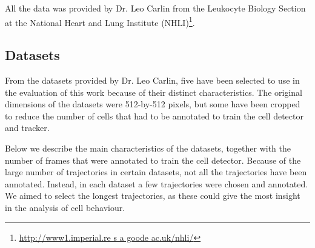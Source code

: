     
    
    All the data was provided by Dr. Leo Carlin from the Leukocyte Biology Section at the National Heart and Lung Institute (NHLI)\footnote{\url{http://www1.imperial.re  s a goode ac.uk/nhli/}}.
    
    \subsection{Datasets \statusfirstdraft}
       
	From the datasets provided by Dr. Leo Carlin, five have been selected to use in the evaluation of this work because of their distinct characteristics. The original dimensions of the datasets were 512-by-512 pixels, but some have been cropped to reduce the number of cells that had to be annotated to train the cell detector and tracker.
	
	Below we describe the main characteristics of the datasets, together with the number of frames that were annotated to train the cell detector. Because of the large number of trajectories in certain datasets, not all the trajectories have been annotated. Instead, in each dataset a few trajectories were chosen and annotated. We aimed to select the longest trajectories, as these could give the most insight in the analysis of cell behaviour.
	

